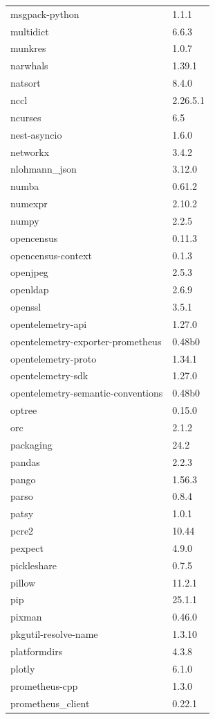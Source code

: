\begin{longtable}{ll}
    msgpack-python&1.1.1 \\
    multidict&6.6.3 \\
    munkres&1.0.7 \\
    narwhals&1.39.1 \\
    natsort&8.4.0 \\
    nccl&2.26.5.1 \\
    ncurses&6.5 \\
    nest-asyncio&1.6.0 \\
    networkx&3.4.2 \\
    nlohmann\_json&3.12.0 \\
    numba&0.61.2 \\
    numexpr&2.10.2 \\
    numpy&2.2.5 \\
    opencensus&0.11.3 \\
    opencensus-context&0.1.3 \\
    openjpeg&2.5.3 \\
    openldap&2.6.9 \\
    openssl&3.5.1 \\
    opentelemetry-api&1.27.0 \\
    opentelemetry-exporter-prometheus&0.48b0 \\
    opentelemetry-proto&1.34.1 \\
    opentelemetry-sdk&1.27.0 \\
    opentelemetry-semantic-conventions&0.48b0 \\
    optree&0.15.0 \\
    orc&2.1.2 \\
    packaging&24.2 \\
    pandas&2.2.3 \\
    pango&1.56.3 \\
    parso&0.8.4 \\
    patsy&1.0.1 \\
    pcre2&10.44 \\
    pexpect&4.9.0 \\
    pickleshare&0.7.5 \\
    pillow&11.2.1 \\
    pip&25.1.1 \\
    pixman&0.46.0 \\
    pkgutil-resolve-name&1.3.10 \\
    platformdirs&4.3.8 \\
    plotly&6.1.0 \\
    prometheus-cpp&1.3.0 \\
    prometheus\_client&0.22.1 \\

\end{longtable}
